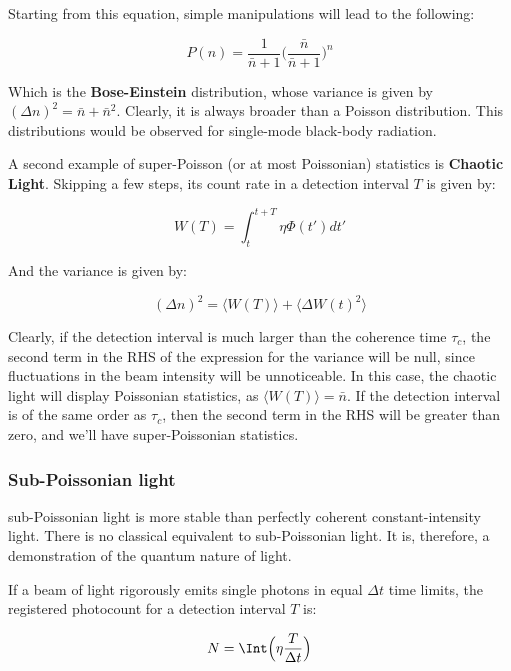 \documentclass[12pt,a4paper]{report}
\begin{document}
Starting from this equation, simple manipulations will lead to the following:

\begin{equation}
    P(n)=\frac{1}{\bar{n}+1}\Big(\frac{\bar{n}}{\bar{n}+1}\Big)^n
\end{equation}

Which is the \textbf{Bose-Einstein} distribution, whose variance is given by $(\Delta n)^2=\bar{n}+\bar{n}^2$. Clearly, it is always broader than a Poisson distribution. This distributions would be observed for single-mode black-body radiation.

A second example of super-Poisson (or at most Poissonian) statistics is \textbf{Chaotic Light}. Skipping a few steps, its count rate in a detection interval $T$ is given by:

\begin{equation}
    W(T)=\int_{t}^{t+T}\eta \Phi(t')dt'
\end{equation}

And the variance is given by:

\begin{equation}
    (\Delta n)^2 = \langle W(T) \rangle + \langle \Delta W(t)^2 \rangle
\end{equation}

Clearly, if the detection interval is much larger than the coherence time $\tau_c$, the second term in the RHS of the expression for the variance will be null, since fluctuations in the beam intensity will be unnoticeable. In this case, the chaotic light will display Poissonian statistics, as $\langle W(T) \rangle=\bar{n}$. If the detection interval is of the same order as $\tau_c$, then the second term in the RHS will be greater than zero, and we'll have super-Poissonian statistics.

\subsubsection{Sub-Poissonian light}

sub-Poissonian light is more stable than perfectly coherent constant-intensity light. There is no classical equivalent to sub-Poissonian light. It is, therefore, a demonstration of the quantum nature of light.

If a beam of light rigorously emits single photons in equal $\Delta t$ time limits, the registered photocount for a detection interval $T$ is:

\begin{equation}
    N=\Int\Big(\eta\frac{T}{\Delta t}\Big)
\end{equation}
\end{document}
